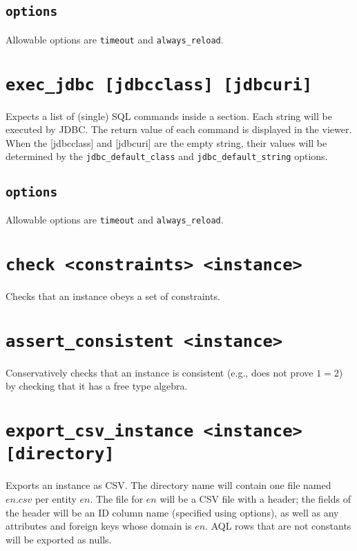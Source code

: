 \documentclass[10pt]{book}
\begin{document}
\subsection{{\tt options}}

Allowable options are {\tt timeout} and {\tt always\_reload}.

\section{{\tt exec\_jdbc [jdbcclass] [jdbcuri]}}
Expects a list of (single) SQL commands inside a section.  Each string will be executed by JDBC.  The return value of each command is displayed in the viewer.  When the [jdbcclass] and [jdbcuri] are the empty string, their values will be determined by the {\tt jdbc\_default\_class} and {\tt jdbc\_default\_string} options.

\subsection{{\tt options}}

Allowable options are {\tt timeout} and {\tt always\_reload}.

\section{{\tt check <constraints> <instance>}}

Checks that an instance obeys a set of constraints.

\section{{\tt assert\_consistent <instance>}}

Conservatively checks that an instance is consistent (e.g., does not prove $1=2$) by checking that it has a free type algebra.


\section{{\tt export\_csv\_instance <instance> [directory]}} 

Exports an instance as CSV.  The directory name will contain one file named $en.csv$ per entity $en$.  The file for $en$ will be a CSV file with a header; the fields of the header will be an ID column name (specified using options), as well as any attributes and foreign keys whose domain is $en$.   AQL rows that are not constants will be exported as nulls.  
\end{document}
